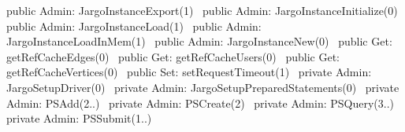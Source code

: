 public \LA{}Admin: JargoInstanceExport(1)~{\nwtagstyle{}}\RA{}
public \LA{}Admin: JargoInstanceInitialize(0)~{\nwtagstyle{}}\RA{}
public \LA{}Admin: JargoInstanceLoad(1)~{\nwtagstyle{}}\RA{}
public \LA{}Admin: JargoInstanceLoadInMem(1)~{\nwtagstyle{}}\RA{}
public \LA{}Admin: JargoInstanceNew(0)~{\nwtagstyle{}}\RA{}
public \LA{}Get: getRefCacheEdges(0)~{\nwtagstyle{}}\RA{}
public \LA{}Get: getRefCacheUsers(0)~{\nwtagstyle{}}\RA{}
public \LA{}Get: getRefCacheVertices(0)~{\nwtagstyle{}}\RA{}
public \LA{}Set: setRequestTimeout(1)~{\nwtagstyle{}}\RA{}
private \LA{}Admin: JargoSetupDriver(0)~{\nwtagstyle{}}\RA{}
private \LA{}Admin: JargoSetupPreparedStatements(0)~{\nwtagstyle{}}\RA{}
private \LA{}Admin: PSAdd(2..)~{\nwtagstyle{}}\RA{}
private \LA{}Admin: PSCreate(2)~{\nwtagstyle{}}\RA{}
private \LA{}Admin: PSQuery(3..)~{\nwtagstyle{}}\RA{}
private \LA{}Admin: PSSubmit(1..)~{\nwtagstyle{}}\RA{}
\nwendcode{}\nwdocspar

